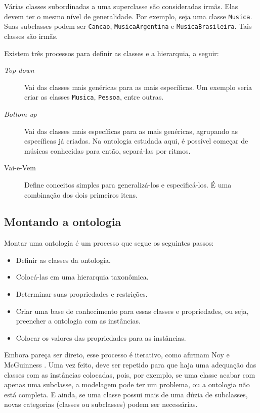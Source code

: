 Várias classes subordinadas a uma superclasse são consideradas irmãs. Elas devem ter o mesmo nível de generalidade. Por exemplo, seja uma classe \texttt{Musica}. Suas subclasses podem ser \texttt{Cancao}, \texttt{MusicaArgentina} e \texttt{MusicaBrasileira}. Tais classes são irmãs.

Existem três processos para definir as classes e a hierarquia, a seguir:

\begin{description}
	\item[\textit{Top-down}] Vai das classes mais genéricas para as mais específicas. Um exemplo seria criar as classes \texttt{Musica}, \texttt{Pessoa}, entre outras.
	\item[\textit{Bottom-up}] Vai das classes mais específicas para as mais genéricas, agrupando as específicas já criadas. Na ontologia estudada aqui, é possível começar de músicas conhecidas para então, separá-las por ritmos.
	\item[Vai-e-Vem] Define conceitos simples para generalizá-los e especificá-los. É uma com\-bi\-na\-ção dos dois primeiros itens.
\end{description}

\subsection{Montando a ontologia}

Montar uma ontologia é um processo que segue os seguintes passos:

\begin{itemize}
	\item Definir as classes da ontologia.
	\item Colocá-las em uma hierarquia taxonômica.
	\item Determinar suas propriedades e restrições.
	\item Criar uma base de conhecimento para essas classes e propriedades, ou seja, preencher a ontologia com as instâncias.
	\item Colocar os valores das propriedades para as instâncias.
\end{itemize}

Embora pareça ser direto, esse processo é iterativo, como afirmam Noy e McGuinness  \citep{ontoNoy}. Uma vez feito, deve ser repetido para que haja uma adequação das classes com as instâncias colocadas, pois, por exemplo, se uma classe acabar com apenas uma subclasse, a modelagem pode ter um problema, ou a ontologia não está completa. E ainda, se uma classe possui mais de uma dúzia de subclasses, novas categorias (classes ou subclasses) podem ser necessárias. 

